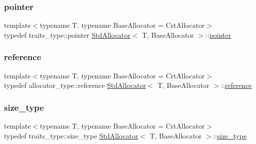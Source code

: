 \mbox{\label{classStdAllocator_a0c970fb2525af736640f0ac3a29d45c5}} 
\subsubsection{\texorpdfstring{pointer}{pointer}}
{\footnotesize\ttfamily template$<$typename T, typename Base\+Allocator = Crt\+Allocator$>$ \\
typedef traits\+\_\+type\+::pointer \hyperlink{classStdAllocator}{Std\+Allocator}$<$ T, Base\+Allocator $>$\+::\hyperlink{classStdAllocator_a0c970fb2525af736640f0ac3a29d45c5}{pointer}}

\mbox{\label{classStdAllocator_a108581b842584639473a6d3fdd135598}} 
\subsubsection{\texorpdfstring{reference}{reference}}
{\footnotesize\ttfamily template$<$typename T, typename Base\+Allocator = Crt\+Allocator$>$ \\
typedef allocator\+\_\+type\+::reference \hyperlink{classStdAllocator}{Std\+Allocator}$<$ T, Base\+Allocator $>$\+::\hyperlink{classStdAllocator_a108581b842584639473a6d3fdd135598}{reference}}

\mbox{\label{classStdAllocator_af0b177dc293fe5b985ba9e27de23b2c1}} 
\subsubsection{\texorpdfstring{size\+\_\+type}{size\_type}}
{\footnotesize\ttfamily template$<$typename T, typename Base\+Allocator = Crt\+Allocator$>$ \\
typedef traits\+\_\+type\+::size\+\_\+type \hyperlink{classStdAllocator}{Std\+Allocator}$<$ T, Base\+Allocator $>$\+::\hyperlink{classStdAllocator_af0b177dc293fe5b985ba9e27de23b2c1}{size\+\_\+type}}

\mbox{\label{classStdAllocator_a5cc8d5905b0333753db9d7437aeadfc0}} 
